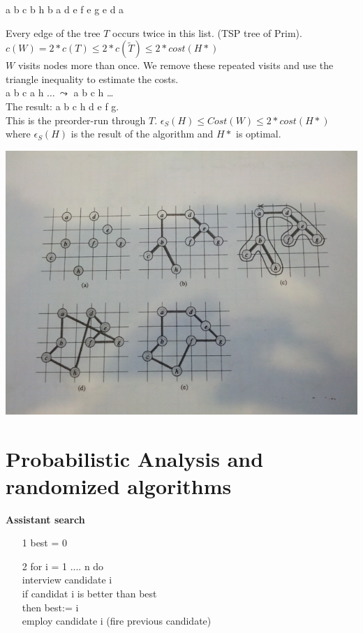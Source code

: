 \begin{example*}
a b c b h b a d e f e g e d a
\end{example*}
Every edge of the tree $T$ occurs twice in this list. (TSP tree of Prim).\\
$c(W) = 2*c(T) \le 2 * c(\widetilde{T}) \le 2 * cost (H*)$\\
$W$ visits nodes more than once. We remove these repeated visits and use the triangle inequality to
estimate the costs.\\
a b c a h $\ldots \: \leadsto$ a b c h \ldots\\
The result: a b c h d e f g.\\
This is the preorder-run through $T$.
$\epsilon_{S}(H) \le Cost(W) \le 2 * cost(H*)$ where $\epsilon_{S}(H)$ is the result of the algorithm and $H*$ is optimal.

\includegraphics[width=\textwidth]{diagrams/Chapter7_Example4.png}

\section{Probabilistic Analysis and randomized algorithms}

\textbf{Assistant search}
\begin{enumerate}
  \item[1] best = 0
  \item[2] for i = 1 .... n do\\
\noindent\hspace*{10mm}	interview candidate i\\
\noindent\hspace*{10mm}	if candidat i is better than best\\
\noindent\hspace*{20mm}		then best:= i\\
\noindent\hspace*{20mm}		employ candidate i (fire previous candidate)\\
\end{enumerate}

